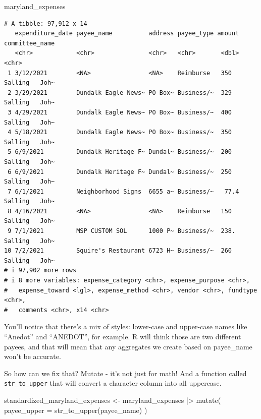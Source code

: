 \documentclass[
  letterpaper,
  DIV=11,
  numbers=noendperiod]{scrreprt}
\newenvironment{Shaded}{\begin{snugshade}}{\end{snugshade}}
\newcommand{\AttributeTok}[1]{\textcolor[rgb]{0.40,0.45,0.13}{#1}}
\newcommand{\FunctionTok}[1]{\textcolor[rgb]{0.28,0.35,0.67}{#1}}
\newcommand{\NormalTok}[1]{\textcolor[rgb]{0.00,0.23,0.31}{#1}}
\newcommand{\OtherTok}[1]{\textcolor[rgb]{0.00,0.23,0.31}{#1}}
\newcommand{\SpecialCharTok}[1]{\textcolor[rgb]{0.37,0.37,0.37}{#1}}
\begin{document}
\begin{Shaded}
\begin{Highlighting}[]
\NormalTok{maryland\_expenses}
\end{Highlighting}
\end{Shaded}

\begin{verbatim}
# A tibble: 97,912 x 14
   expenditure_date payee_name          address payee_type amount committee_name
   <chr>            <chr>               <chr>   <chr>       <dbl> <chr>         
 1 3/12/2021        <NA>                <NA>    Reimburse   350   Salling   Joh~
 2 3/29/2021        Dundalk Eagle News~ PO Box~ Business/~  329   Salling   Joh~
 3 4/29/2021        Dundalk Eagle News~ PO Box~ Business/~  400   Salling   Joh~
 4 5/18/2021        Dundalk Eagle News~ PO Box~ Business/~  350   Salling   Joh~
 5 6/9/2021         Dundalk Heritage F~ Dundal~ Business/~  200   Salling   Joh~
 6 6/9/2021         Dundalk Heritage F~ Dundal~ Business/~  250   Salling   Joh~
 7 6/1/2021         Neighborhood Signs  6655 a~ Business/~   77.4 Salling   Joh~
 8 4/16/2021        <NA>                <NA>    Reimburse   150   Salling   Joh~
 9 7/1/2021         MSP CUSTOM SOL      1000 P~ Business/~  238.  Salling   Joh~
10 7/2/2021         Squire's Restaurant 6723 H~ Business/~  260   Salling   Joh~
# i 97,902 more rows
# i 8 more variables: expense_category <chr>, expense_purpose <chr>,
#   expense_toward <lgl>, expense_method <chr>, vendor <chr>, fundtype <chr>,
#   comments <chr>, x14 <chr>
\end{verbatim}

You'll notice that there's a mix of styles: lower-case and upper-case
names like ``Anedot'' and ``ANEDOT'', for example. R will think those
are two different payees, and that will mean that any aggregates we
create based on payee\_name won't be accurate.

So how can we fix that? Mutate - it's not just for math! And a function
called \texttt{str\_to\_upper} that will convert a character column into
all uppercase.

\begin{Shaded}
\begin{Highlighting}[]
\NormalTok{standardized\_maryland\_expenses }\OtherTok{\textless{}{-}}\NormalTok{ maryland\_expenses }\SpecialCharTok{|\textgreater{}}
  \FunctionTok{mutate}\NormalTok{(}
    \AttributeTok{payee\_upper =} \FunctionTok{str\_to\_upper}\NormalTok{(payee\_name)}
\NormalTok{)}
\end{Highlighting}
\end{Shaded}
\end{document}
